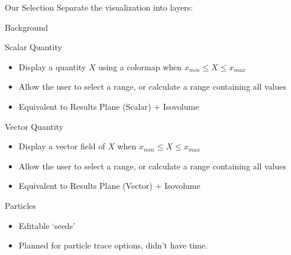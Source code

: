 \begin{frame}{Our Selection}
        Separate the visualization into layers:
        \vspace{1em}

        \begin{wideitemize}
            \item Background
            \item Scalar Quantity
            \begin{itemize}
                \item Display a quantity $X$ using a colormap when $x_{min} \leq X \leq x_{max}$
                \item Allow the user to select a range, or calculate a range containing all values
                \item Equivalent to Results Plane (Scalar) + Isovolume
            \end{itemize}
            \item Vector Quantity 
            \begin{itemize}
                \item Display a vector field of $X$ when $x_{min} \leq X \leq x_{max}$
                \item Allow the user to select a range, or calculate a range containing all values
                \item Equivalent to Results Plane (Vector) + Isovolume
            \end{itemize}
            \item Particles
                \begin{itemize}
                    \item Editable `seeds'
                    \item Planned for particle trace options, didn't have time.
                \end{itemize}
        \end{wideitemize}
\end{frame}

